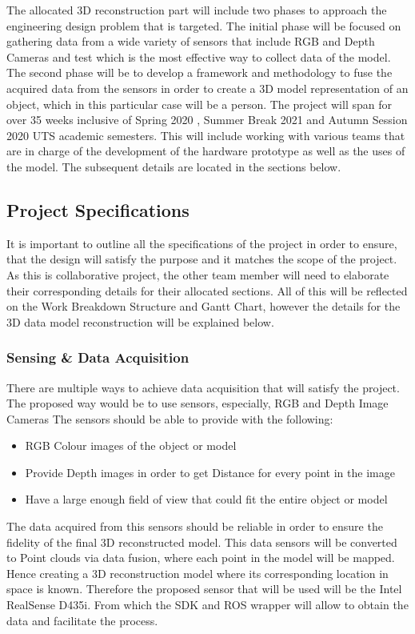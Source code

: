 \documentclass[12pt]{report}
\begin{document}
The allocated 3D reconstruction part  will include two phases to approach the engineering design problem that is targeted. 
The initial phase will be focused on gathering data from a wide variety of sensors that include RGB and Depth Cameras and test which is the most effective way to collect data of the model. 
The second phase will be to develop a framework and methodology to fuse the acquired data from the sensors in order to create a 3D model representation of an object, which in this particular case will be a person. 
The project will span for over 35 weeks inclusive of Spring 2020 , Summer Break 2021 and Autumn Session 2020 UTS academic semesters. This will include working with various teams that are in charge of the development of the hardware prototype as well as the uses of the model. The subsequent details are located in the sections below. 

\subsection{Project Specifications}
It is important to outline all the specifications of the project in order to ensure, that the design  will satisfy the purpose and it matches the scope of the project. As this is collaborative project, the other team member will need to elaborate their corresponding details for their allocated sections. 
All of this will be reflected on the Work Breakdown Structure and Gantt Chart, however the details for the 3D data model reconstruction will be explained below.  

\subsubsection{Sensing \& Data Acquisition}
There are multiple ways to achieve data acquisition that will satisfy the project. The proposed way would be to use sensors, especially, RGB and Depth Image Cameras
The sensors should be able to provide with the following:
\begin{itemize}
  \item RGB  Colour images of the object or model
  \item Provide Depth images in order to get Distance for every point in the image
  \item Have a large enough field of view that could fit the entire object or model
\end{itemize}
The data acquired from this sensors should be reliable in order to ensure the fidelity of  the final 3D reconstructed model. This data sensors will be converted to Point clouds via data fusion, where each point in the model will be mapped. Hence creating a 3D reconstruction model where its corresponding location in space is known. 
Therefore the proposed sensor that will be used will be the Intel RealSense D435i. From which the SDK and ROS wrapper will allow to obtain the data and facilitate the process. 
\end{document}
